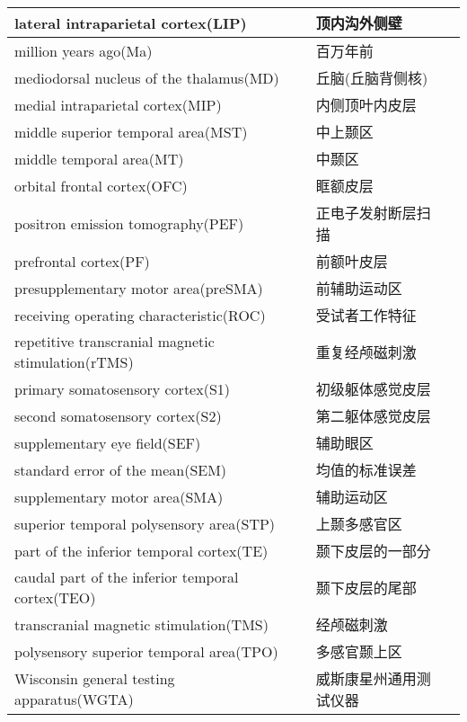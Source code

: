 \begin{table}[htbp]
{\begin{tabular}{llll}
        \midrule
        lateral intraparietal cortex(LIP)       &&顶内沟外侧壁   \\
        \midrule
        million years ago(Ma)       &&百万年前   \\
        \midrule
        mediodorsal nucleus of the thalamus(MD)      &&丘脑(丘脑背侧核)   \\
        \midrule
        medial intraparietal cortex(MIP)      &&内侧顶叶内皮层   \\
        \midrule
        middle superior temporal area(MST)     &&中上颞区   \\
        \midrule
        middle temporal area(MT)       &&中颞区   \\
        \midrule
        orbital frontal cortex(OFC)       &&眶额皮层   \\
        \midrule
        positron emission tomography(PEF)       &&正电子发射断层扫描   \\
        \midrule
        prefrontal cortex(PF)       &&前额叶皮层   \\
        \midrule
        presupplementary motor area(preSMA)       &&前辅助运动区   \\
        \midrule
        receiving operating characteristic(ROC)       &&受试者工作特征   \\
        \midrule
        repetitive transcranial magnetic stimulation(rTMS)      &&重复经颅磁刺激   \\
        \midrule
        primary somatosensory cortex(S1)      &&初级躯体感觉皮层   \\
        \midrule
        second somatosensory cortex(S2)      &&第二躯体感觉皮层   \\
        \midrule
        supplementary eye field(SEF)      &&辅助眼区   \\
        \midrule
        standard error of the mean(SEM)      &&均值的标准误差   \\
        \midrule
        supplementary motor area(SMA)      &&辅助运动区   \\
        \midrule
        superior temporal polysensory area(STP)      &&上颞多感官区   \\
        \midrule
        part of the inferior temporal cortex(TE)     &&颞下皮层的一部分   \\
        \midrule
        caudal part of the inferior temporal cortex(TEO)      &&颞下皮层的尾部   \\
        \midrule
        transcranial magnetic stimulation(TMS)     &&经颅磁刺激   \\
        \midrule
        polysensory superior temporal area(TPO)      &&多感官颞上区   \\
        \midrule
        Wisconsin general testing apparatus(WGTA)      &&威斯康星州通用测试仪器   \\

		\bottomrule  

	\end{tabular}}
\end{table}%





